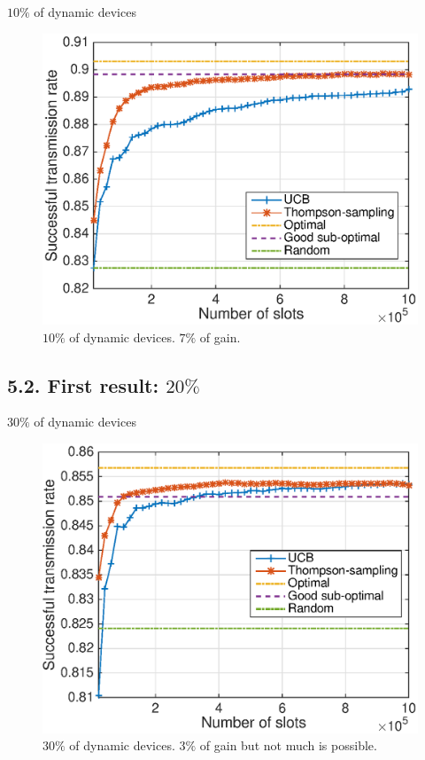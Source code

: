 \documentclass[12pt,english,ignorenonframetext,aspectratio=169,]{beamer}
\begin{document}
\begin{frame}{\(10\%\) of dynamic devices}

\begin{figure}[h!]
\centering
\includegraphics[height=0.74\textheight]{10intelligent.eps}
\caption{\small{$10\%$ of dynamic devices. $7\%$ of gain.}}
\end{figure}

\end{frame}



\subsection{\hfill{}5.2. First result: $20\%$\hfill{}}

\begin{frame}{\(30\%\) of dynamic devices}

\begin{figure}[h!]
\centering
\includegraphics[height=0.74\textheight]{30intelligent.eps}
\caption{\small{$30\%$ of dynamic devices.} $3\%$ of gain but not much is possible.}
\end{figure}

\end{frame}
\end{document}
